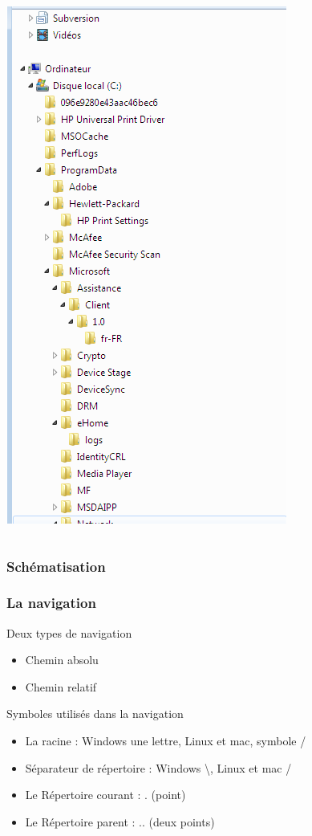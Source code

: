 \documentclass[handout, table,svgnames,hyperref={pdfpagemode=FullScreen}]{beamer}
\begin{document}
\begin{frame}
\begin{columns}
\begin{column}[c]{5cm}
				\includegraphics[scale=0.25]{image/ArboWin.png}
			\end{column}
		\end{columns}
\end{frame}

\begin{frame}
		\frametitle{Schématisation}
		\begin{center}
			
		\end{center}
\end{frame}	

\begin{frame}
		\frametitle{La navigation}
		\begin{block}{Deux types de navigation}
			\begin{itemize}
				\item Chemin absolu
				\item Chemin relatif
			\end{itemize}
		\end{block}
		\begin{block}{Symboles utilisés dans la navigation}
			\begin{itemize}
				\item La racine : Windows une lettre, Linux et mac, symbole / 
				\item Séparateur de répertoire : Windows  \textbackslash, Linux et mac  /
				\item Le Répertoire courant : . (point)
				\item Le Répertoire parent : .. (deux points)
			\end{itemize}
		\end{block}
\end{frame}
\end{document}
